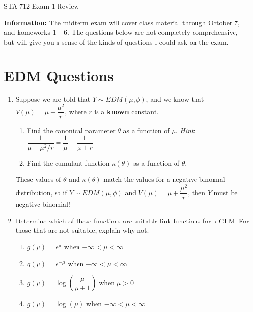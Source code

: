 \documentclass[11pt]{article}
\begin{document}
\begin{center}
\Large
STA 712 Exam 1 Review\\
\normalsize
\vspace{5mm}
\end{center} 

\noindent \textbf{Information:} The midterm exam will cover class material through October 7, and homeworks 1 -- 6. The questions below are not completely comprehensive, but will give you a sense of the kinds of questions I could ask on the exam.

\section*{EDM Questions}

\begin{enumerate}
\item Suppose we are told that $Y \sim EDM(\mu, \phi)$, and we know that $V(\mu) = \mu + \dfrac{\mu^2}{r}$, where $r$ is a \textbf{known} constant. 

\begin{enumerate}
\item Find the canonical parameter $\theta$ as a function of $\mu$. \textit{Hint}: $\dfrac{1}{\mu + \mu^2/r} = \dfrac{1}{\mu} - \dfrac{1}{\mu + r}$
\item Find the cumulant function $\kappa(\theta)$ as a function of $\theta$.
\end{enumerate}

These values of $\theta$ and $\kappa(\theta)$ match the values for a negative binomial distribution, so if $Y \sim EDM(\mu, \phi)$ and $V(\mu) = \mu + \dfrac{\mu^2}{r}$, then $Y$ must be negative binomial!

\bigskip

\item Determine which of these functions are suitable link functions for a GLM. For those that are not suitable, explain why not.

\begin{enumerate}
\item $g(\mu) = e^\mu$ when $-\infty < \mu < \infty$
\item $g(\mu) = e^{-\mu}$ when $-\infty < \mu < \infty$
\item $g(\mu) = \log \left( \dfrac{\mu}{\mu + 1} \right)$ when $\mu > 0$
\item $g(\mu) = \log(\mu)$ when $-\infty < \mu < \infty$
\end{enumerate}


\end{enumerate}
\end{document}
